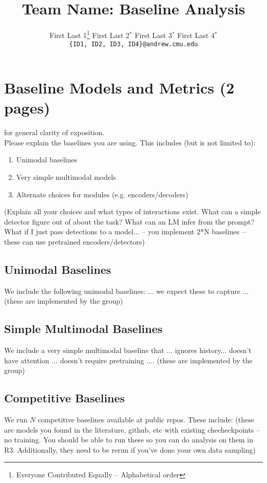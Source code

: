 \documentclass{article} %
\title{Team Name: Baseline Analysis}
\author{
  First Last 1\thanks{\hspace{4pt}Everyone Contributed Equally -- Alphabetical order} \hspace{2em} First Last 2$^*$ \hspace{2em} First Last 3$^*$ \hspace{2em} First Last 4$^*$ \\
  \texttt{\{ID1, ID2, ID3, ID4\}@andrew.cmu.edu}
  }
\date{}
\begin{document}
\maketitle


\section{Baseline Models and Metrics (2 pages)}
 for general clarity of exposition. \\

Please explain the baselines you are using. This includes (but is not limited to):
\begin{enumerate}
  \item Unimodal baselines
  \item Very simple multimodal models  
  \item Alternate choices for modules (e.g. encoders/decoders)
\end{enumerate}

(Explain all your choices and what types of interactions exist. What can a simple detector figure out of about the task? What can an LM infer from the prompt? What if I just pass detections to a model... -- you implement 2*N baselines -- these can use pretrained encoders/detectors)

\subsection{ Unimodal Baselines}
We include the following unimodal baselines: ... we expect these to capture ... (these are implemented by the group)

\subsection{ Simple Multimodal Baselines}
We include a very simple multimodal baseline that ... ignores history... doesn't have attention ... doesn't require pretraining ....
(these are implemented by the group)

\subsection{ Competitive Baselines}
We run $N$ competitive baselines available at public repos.  These include: 
(these are models you found in the literature, github, etc with existing checheckpoints -- no training. You should be able to run these so you can do analysis on them in R3.  Additionally, they need to be rerun if you've done your own data sampling)
\end{document}
